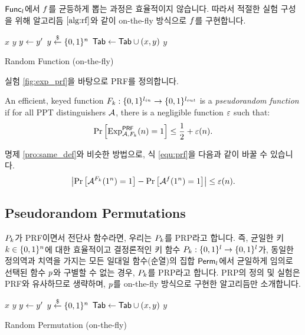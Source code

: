 $\textsf{Func}_l$에서 $f$를 균등하게 뽑는 과정은 효율적이지 않습니다. 따라서 적절한 실험 구성을 위해 
알고리듬 $\ref{alg:rf}$와 같이 on-the-fly 방식으로 $f$를 구현합니다.

\begin{algorithm}
  \begin{algorithmic}[1]
    \Require $x$
    \Ensure $y$
    \State $y \leftarrow y'$
    \State $y \overset{\$}\leftarrow \{0, 1\}^{n}$
    \State $\textsf{Tab} \leftarrow \textsf{Tab} \cup (x, y)$
    \EndIf
    \State \Return $y$
    \EndProcedure
  \end{algorithmic}
  \caption{Random Function (on-the-fly)}
  \label{alg:rf}
\end{algorithm}

실험 \ref{fig:exp_prf}을 바탕으로 PRF를 정의합니다.

\begin{definition} \label{def:prf}
  An efficient, keyed function
  $F_{k}: \{0, 1\}^{l_{in}} \to \{0, 1\}^{l_{out}}$ is a \emph{pseudorandom function} 
  if for all PPT distinguishers $\mathcal{A}$, there is a negligible function $\varepsilon$ 
  such that:
  \begin{equation}
    \text{Pr} \left[ \text{Exp}_{\mathcal{A}, F_{k}}^{\textsf{PRF}}(n) = 1 \right] \le \frac{1}{2} + \varepsilon(n).
    \label{equ:prf}
  \end{equation}
\end{definition}

명제 \ref{pro:same_def}와 비슷한 방법으로, 식 \ref{equ:prf}을 다음과 같이 바꿀 수 있습니다.
\begin{equation}
  \left| \text{Pr} \left[ \mathcal{A}^{F_{k}}(1^n) = 1 \right] - \text{Pr} \left[ \mathcal{A}^{f}(1^n) = 1 \right] \right| \le \varepsilon(n).
  \label{equ:prf2}
\end{equation}

\subsection*{Pseudorandom Permutations}
$P_{k}$가 PRF이면서 전단사 함수라면, 우리는 $P_{k}$를 PRP라고 합니다. 즉, 균일한 키 
$k \in \{0, 1\}^{n}$에 대한 효율적이고 결정론적인 키 함수 
$P_{k}: \{0, 1\}^{l} \to \{0, 1\}^{l}$가, 동일한 정의역과 치역을 가지는 모든 일대일
함수(순열)의 집합 $\textsf{Perm}_l$에서 균일하게 임의로 선택된 함수 $p$와 구별할 수 없는 경우, 
$P_{k}$를 PRP라고 합니다. PRP의 정의 및 실험은 PRF와 유사하므로 생략하며, $p$를 on-the-fly 
방식으로 구현한 알고리듬만 소개합니다.
\begin{algorithm}
  \begin{algorithmic}[1]
    \Require $x$
    \Ensure $y$
    \State $y \leftarrow y'$
    \State $y \overset{\$}\leftarrow \{0, 1\}^{n}$
    \EndWhile
    \State $\textsf{Tab} \leftarrow \textsf{Tab} \cup (x, y)$
    \EndIf
    \State \Return $y$
    \EndProcedure
  \end{algorithmic}
  \caption{Random Permutation (on-the-fly)}
  \label{alg:rp}
\end{algorithm}

